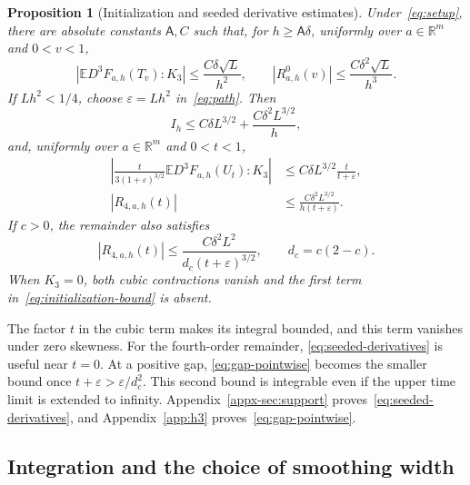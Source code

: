 \documentclass[11pt,letterpaper]{article}
\newtheorem{proposition}{Proposition}
\theoremstyle{remark}
\newcommand{\E}{\mathbb E}
\newcommand{\R}{\mathbb R}
\begin{document}
\begin{proposition}[Initialization and seeded derivative estimates]
\label{an:prop:derivative}
Under~\eqref{eq:setup}, there are absolute constants \(\mathsf A,C\)
such that, for \(h\ge\mathsf A\delta\), uniformly over
\(a\in\R^m\) and \(0<v<1\),
\begin{equation}
 |\E D^3F_{a,h}(T_v):K_3|\le\frac{C\delta\sqrt L}{h^2},
 \qquad |R^0_{a,h}(v)|\le\frac{C\delta^2\sqrt L}{h^3}.
 \label{eq:direct-initialization}
\end{equation}
If \(Lh^2<1/4\), choose \(\varepsilon=Lh^2\) in~\eqref{eq:path}.
Then
\begin{equation}
 I_h\le C\delta L^{3/2}+\frac{C\delta^2L^{3/2}}h,
 \label{eq:initialization-bound}
\end{equation}
and, uniformly over \(a\in\R^m\) and \(0<t<1\),
\begin{equation}
 \begin{aligned}
 \left|\frac{t}{3(1+\varepsilon)^{3/2}}
          \E D^3F_{a,h}(U_t):K_3\right|
 &\le C\delta L^{3/2}\frac{t}{t+\varepsilon},\\
 |R_{4,a,h}(t)|&\le\frac{C\delta^2L^{3/2}}{h(t+\varepsilon)}.
 \end{aligned}
 \label{eq:seeded-derivatives}
\end{equation}
If \(c>0\), the remainder also satisfies
\begin{equation}
 |R_{4,a,h}(t)|\le\frac{C\delta^2L^2}{d_c(t+\varepsilon)^{3/2}},
 \qquad d_c=c(2-c).
 \label{eq:gap-pointwise}
\end{equation}
When \(K_3=0\), both cubic contractions vanish and the first term
in~\eqref{eq:initialization-bound} is absent.
\end{proposition}

The factor \(t\) in the cubic term makes its integral bounded, and
this term vanishes under zero skewness. For the fourth-order remainder,
\eqref{eq:seeded-derivatives} is useful near \(t=0\). At a positive
gap, \eqref{eq:gap-pointwise} becomes the smaller bound once
\(t+\varepsilon>\varepsilon/d_c^2\). This second bound is integrable
even if the upper time limit is extended to infinity.
Appendix~\ref{appx-sec:support} proves~\eqref{eq:seeded-derivatives},
and Appendix~\ref{app:h3} proves~\eqref{eq:gap-pointwise}.

\subsection{Integration and the choice of smoothing width}
\label{sec:rate}
\end{document}
